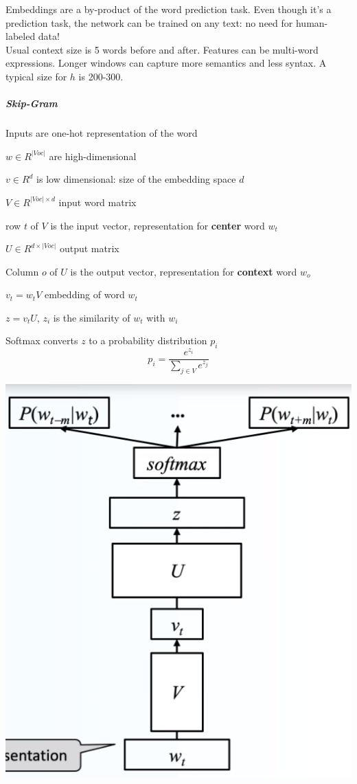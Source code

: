 \documentclass[10pt]{report}
\begin{document}
Embeddings are a by-product of the word prediction task. Even though it's a prediction task, the network can be trained on any text: no need for human-labeled data!\\
Usual context size is 5 words before and after. Features can be multi-word expressions. Longer windows can capture more semantics and less syntax. A typical size for $h$ is 200-300.
\subparagraph{Skip-Gram}
\begin{multicols}{2}
\begin{list}{}{}
	\item Inputs are one-hot representation of the word
	\item $w\in R^{|Voc|}$ are high-dimensional
	\item $v\in R^d$ is low dimensional: size of the embedding space $d$
	\item $V\in R^{|Voc|\times d}$ input word matrix
	\item row $t$ of $V$ is the input vector, representation for \textbf{center} word $w_t$
	\item $U\in R^{d\times|Voc|}$ output matrix
	\item Column $o$ of $U$ is the output vector, representation for \textbf{context} word $w_o$
	\item $v_t = w_tV$ embedding of word $w_t$
	\item $z=v_tU$, $z_i$ is the similarity of $w_t$ with $w_i$
	\item Softmax converts $z$ to a probability distribution $p_i$ $$p_i=\frac{e^{z_i}}{\sum_{j\in V}e^{z_j}}$$
\end{list}
\columnbreak
\begin{center}
	\includegraphics[scale=0.5]{5.png}
\end{center}
\end{multicols}
\end{document}

